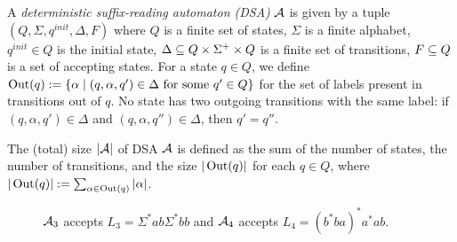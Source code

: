 \begin{definition}[DSA]\label{def:suff-reading-aut}
  A \emph{deterministic suffix-reading automaton (DSA)} $\mathcal{A}$ is given by a
  tuple $(Q, \Sigma, q^{init}, \Delta, F)$ where $Q$ is a finite set
  of states, $\Sigma$ is a finite alphabet, $q^{init} \in Q$ is the
  initial state, $\Delta \subseteq Q \times \Sigma^+ \times Q$ is a finite
  set of transitions, $F \subseteq Q$ is a set of accepting states.  For a
  state $q \in Q$, we define
  $\operatorname{Out}(q) := \{ \alpha \mid (q, \alpha, q') \in \Delta \text{ for some } q'
  \in Q \}$ for the set of labels present in transitions out of
  $q$. No state has two outgoing transitions with the same label:
  if $(q, \alpha, q') \in \Delta$ and $(q, \alpha, q'') \in \Delta$,
  then $q' = q''$.
  
  The (total) size $|\mathcal{A}|$ of DSA $\mathcal{A}$ is defined as the sum of
  the number of states, the number of transitions, and the size
  $|\operatorname{Out}(q)|$ for each $q \in Q$, where
  $|\operatorname{Out}(q)| := \sum_{\alpha \in \operatorname{Out}(q)} |\alpha|$.

  
\end{definition}


\begin{figure}[t]
  \centering
  \caption{$\mathcal{A}_3$ accepts $L_3=\Sigma^* ab \Sigma^*bb$ and $\mathcal{A}_4$
    accepts $L_4=(b^*ba)^*a^*ab$.}
  \label{fig:example-ab-bb}
\end{figure}

